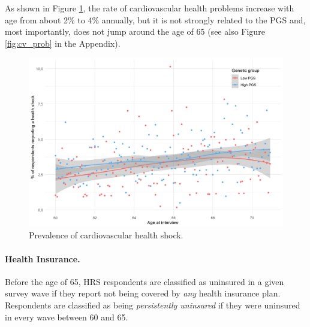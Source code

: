 \documentclass[11pt]{article}
\begin{document}
As shown in Figure \ref{fig:cv}, the rate of cardiovascular health problems increase with age from about 2\% to 4\% annually, but it is not strongly related to the PGS and, most importantly, does not jump around the age of 65 (see also Figure \ref{fig:cv_prob} in the Appendix).

\begin{figure}[!ht]
	\begin{center}
	\includegraphics[width=.7\textwidth]
	{../3_output/over_time/graph_6070cvplot_agebypgs.png}
	\caption{Prevalence of cardiovascular health shock.
	\label{fig:cv}}
	\vspace{-0.8cm}
	\end{center}
\end{figure}



\paragraph{Health Insurance.}
Before the age of 65, HRS respondents are classified as uninsured in a given survey wave if they report not being covered by \textit{any} health insurance plan.
Respondents are classified as being \textit{persistently uninsured} if they were uninsured in every wave between 60 and 65.
\end{document}
